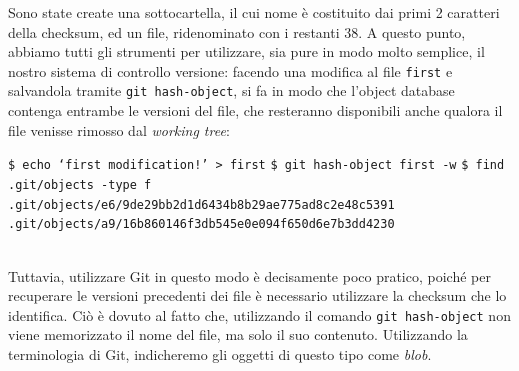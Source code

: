 \documentclass[12pt]{article}
\def\code#1{\texttt{#1}}
\def\minquote#1{`#1'}
\begin{document}
Sono state create una sottocartella, il cui nome è costituito dai primi 2 caratteri della checksum, ed un file, ridenominato con i restanti 38.
A questo punto, abbiamo tutti gli strumenti per utilizzare, sia pure in modo molto semplice, il nostro sistema di controllo versione: facendo una modifica al file \code{first} e salvandola tramite \code{git hash-object}, si fa in modo che l'object database contenga entrambe le versioni del file, che resteranno disponibili anche qualora il file venisse rimosso dal \textit{working tree}:
\begin{algorithm*}
	\begin{algorithmic}
		\State \code{\$ echo \minquote{first modification!} > first}
		\State \code{\$ git hash-object first -w}	
		\State \code{\$ find .git/objects -type f}
		\State \code{.git/objects/e6/9de29bb2d1d6434b8b29ae775ad8c2e48c5391}
		\State \code{.git/objects/a9/16b860146f3db545e0e094f650d6e7b3dd4230}
	\end{algorithmic}
\end{algorithm*}
\ \\Tuttavia, utilizzare Git in questo modo è decisamente poco pratico, poiché per recuperare le versioni precedenti dei file è necessario utilizzare la checksum che lo identifica. Ciò è dovuto al fatto che, utilizzando il comando \code{git hash-object} non viene memorizzato il nome del file, ma solo il suo contenuto. Utilizzando la terminologia di Git, indicheremo gli oggetti di questo tipo come \textit{blob}.
\end{document}
